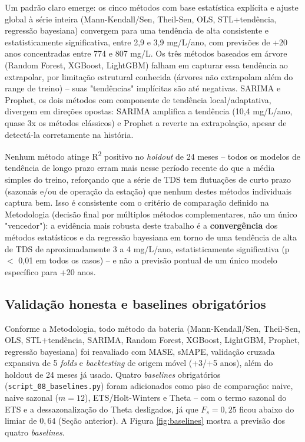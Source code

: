 Um padrão claro emerge: os cinco métodos com base estatística explícita e ajuste global à série inteira (Mann-Kendall/Sen, Theil-Sen, OLS, STL+tendência, regressão bayesiana) convergem para uma tendência de alta consistente e estatisticamente significativa, entre 2,9 e 3,9 mg/L/ano, com previsões de +20 anos concentradas entre 774 e 807 mg/L. Os três métodos baseados em árvore (Random Forest, XGBoost, LightGBM) falham em capturar essa tendência ao extrapolar, por limitação estrutural conhecida (árvores não extrapolam além do range de treino) -- suas "tendências" implícitas são até negativas. SARIMA e Prophet, os dois métodos com componente de tendência local/adaptativa, divergem em direções opostas: SARIMA amplifica a tendência (10,4 mg/L/ano, quase 3x os métodos clássicos) e Prophet a reverte na extrapolação, apesar de detectá-la corretamente na história.

Nenhum método atinge R\textsuperscript{2} positivo no \textit{holdout} de 24 meses -- todos os modelos de tendência de longo prazo erram mais nesse período recente do que a média simples do treino, reforçando que a série de TDS tem flutuações de curto prazo (sazonais e/ou de operação da estação) que nenhum destes métodos individuais captura bem. Isso é consistente com o critério de comparação definido na Metodologia (decisão final por múltiplos métodos complementares, não um único "vencedor"): a evidência mais robusta deste trabalho é a \textbf{convergência} dos métodos estatísticos e da regressão bayesiana em torno de uma tendência de alta de TDS de aproximadamente 3 a 4 mg/L/ano, estatisticamente significativa (p $<$ 0,01 em todos os casos) -- e não a previsão pontual de um único modelo específico para +20 anos.

\subsection{Validação honesta e baselines obrigatórios}

Conforme a Metodologia, todo método da bateria (Mann-Kendall/Sen, Theil-Sen, OLS, STL+tendência, SARIMA, Random Forest, XGBoost, LightGBM, Prophet, regressão bayesiana) foi reavaliado com MASE, sMAPE, validação cruzada expansiva de 5 \textit{folds} e \textit{backtesting} de origem móvel (+3/+5 anos), além do holdout de 24 meses já usado. Quatro \textit{baselines} obrigatórios (\texttt{script\_08\_baselines.py}) foram adicionados como piso de comparação: naive, naive sazonal ($m=12$), ETS/Holt-Winters e Theta -- com o termo sazonal do ETS e a dessazonalização do Theta desligados, já que $F_s=0{,}25$ ficou abaixo do limiar de $0{,}64$ (Seção anterior). A Figura \ref{fig:baselines} mostra a previsão dos quatro \textit{baselines}.

